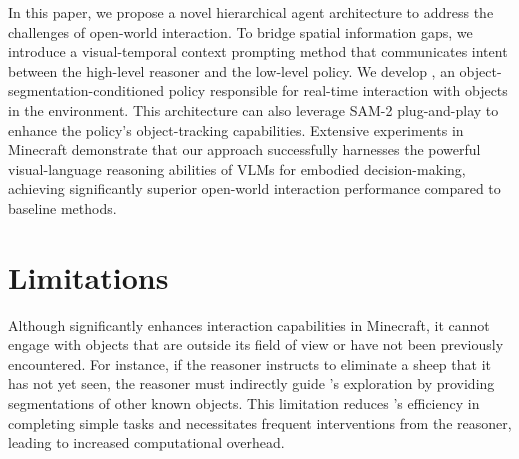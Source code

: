 In this paper, we propose a novel hierarchical agent architecture to address the challenges of open-world interaction. To bridge spatial information gaps, we introduce a visual-temporal context prompting method that communicates intent between the high-level reasoner and the low-level policy. We develop \agent, an object-segmentation-conditioned policy responsible for real-time interaction with objects in the environment. This architecture can also leverage SAM-2 plug-and-play to enhance the policy’s object-tracking capabilities. Extensive experiments in Minecraft demonstrate that our approach successfully harnesses the powerful visual-language reasoning abilities of VLMs for embodied decision-making, achieving significantly superior open-world interaction performance compared to baseline methods. 

\section{Limitations}
\label{sec:limitations}
Although \agent significantly enhances interaction capabilities in Minecraft, it cannot engage with objects that are outside its field of view or have not been previously encountered. For instance, if the reasoner instructs \agent to eliminate a sheep that it has not yet seen, the reasoner must indirectly guide \agent’s exploration by providing segmentations of other known objects. This limitation reduces \agent’s efficiency in completing simple tasks and necessitates frequent interventions from the reasoner, leading to increased computational overhead. 
